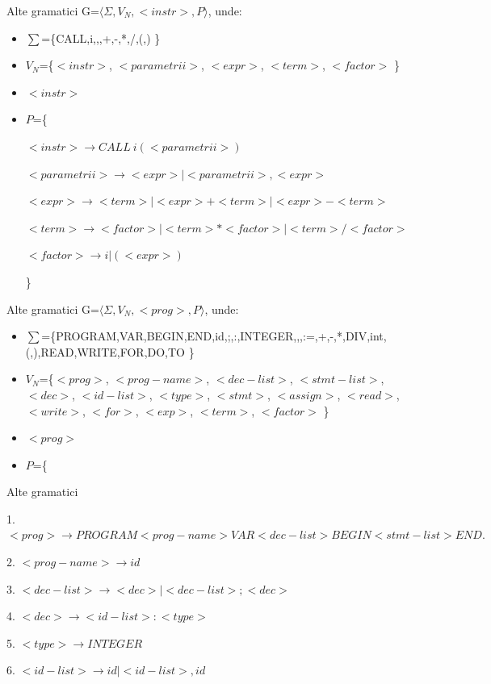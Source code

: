 \documentclass[pdf]{beamer}
\begin{document}
\begin{frame}{Alte gramatici}
G=$\langle \Sigma, V_N, <instr>, P \rangle$, unde:

\begin{itemize}
\item
$\sum$=\{CALL,i,,,+,-,*,/,(,) \}
\item
$V_N$=\{$<instr>$, $<parametrii>$, $<expr>$, $<term>$, $<factor>$ \}
\item
$<instr>$
\item
$P$=\{

$<instr> \rightarrow CALL \ i (<parametrii>)$

$<parametrii> \rightarrow <expr> | <parametrii>, <expr>$

$<expr> \rightarrow <term> | <expr>+<term> | <expr>-<term>$

$<term> \rightarrow <factor> | <term>*<factor> | <term>/<factor>$ 

$<factor> \rightarrow i | (<expr>)$ 

\}
\end{itemize}

\end{frame}



\begin{frame}{Alte gramatici}
G=$\langle \Sigma, V_N, <prog>, P \rangle$, unde:

\begin{itemize}
\item
$\sum$=\{PROGRAM,VAR,BEGIN,END,id,;,:,INTEGER,,,:=,+,-,*,DIV,int,(,),READ,WRITE,FOR,DO,TO \}
\item
$V_N$=\{$<prog>$, $<prog-name>$, $<dec-list>$, $<stmt-list>$, $<dec>$, $<id-list>$, $<type>$, $<stmt>$, $<assign>$, $<read>$, $<write>$, $<for>$, $<exp>$, $<term>$, $<factor>$ \}
\item
$<prog>$
\item
$P$=\{

\end{itemize}

\end{frame}



\begin{frame}{Alte gramatici}

1. $<prog> \rightarrow PROGRAM <prog-name> VAR <dec-list> BEGIN <stmt-list> END. $

2. $<prog-name> \rightarrow id$ 

3. $<dec-list> \rightarrow <dec> | <dec-list> ; <dec> $

4. $<dec> \rightarrow <id-list> : <type> $

5. $<type> \rightarrow INTEGER $

6. $<id-list> \rightarrow id | <id-list> , id $

\end{frame}
\end{document}
